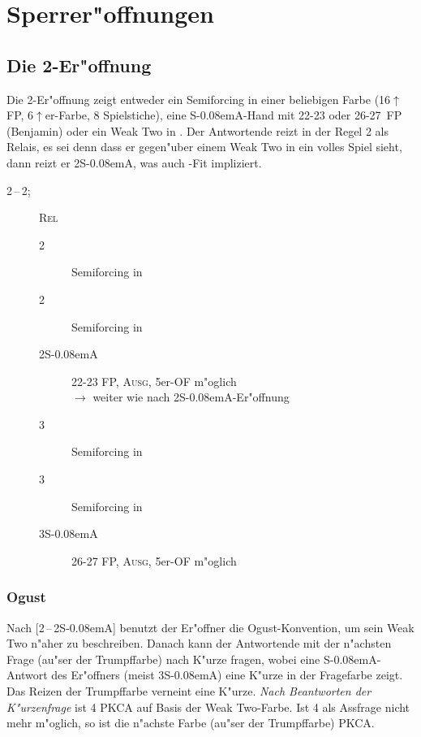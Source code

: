 \documentclass[11pt,german,twocolumn]{scrartcl}
\def\pik{\nobreak\hspace{\cardskip}\Sp\xspace}
\def\coe{\nobreak\hspace{\cardskip}\He\xspace}
\def\kar{\nobreak\hspace{\cardskip}\Di\xspace}
\def\tre{\nobreak\hspace{\cardskip}\Cl\xspace}
\def\ka{\Di\xspace}
\def\ra{$\rightarrow$\xspace}
\def\pl{$\uparrow$\xspace}
\def\ofa{\nobreak\textsf{OF}\xspace}
\def\sa{\nobreak\textsf{S\kern-0.08emA}\xspace}
\def\SA{\nobreak\hspace{\cardskip}\sa}
\def\sep{\,--\,}
\def\bal{\textsc{Ausg}\xspace}
\def\rel{\textsc{Rel}\xspace}
\def\bdsc{\begin{description}}
\def\edsc{\end{description}}
\newcommand{\Index}[1]{#1\index{#1}}
\begin{document}
\newpage
\section{Sperrer"offnungen}

\subsection{Die 2\tre-Er"offnung}

Die 2\tre-Er"offnung zeigt entweder ein Semiforcing in einer beliebigen Farbe
(16\pl FP, 6\pl{}er-Farbe, 8 Spielstiche),
eine \sa-Hand mit 22-23 oder 26-27~FP (Benjamin) oder ein \Index{Weak Two} in \ka. Der
Antwortende reizt in der Regel 2\kar als Relais, es sei denn dass er gegen"uber
einem Weak Two in \ka ein volles Spiel sieht, dann reizt er 2\SA, was auch
\ka-Fit impliziert.

\bdsc
\item[2\tre{}\sep2\kar;] \rel
  \bdsc
  \item[2\coe] Semiforcing in \coe
  \item[2\pik] Semiforcing in \pik
  \item[2\SA] 22-23 FP, \bal, 5er-\ofa m"oglich \\
    \ra weiter wie nach 2\SA-Er"offnung
  \item[3\tre] Semiforcing in \tre
  \item[3\kar] Semiforcing in \kar
  \item[3\SA] 26-27 FP, \bal, 5er-\ofa m"oglich
  \edsc
\edsc

\subsubsection{Ogust} \label{ogust}

Nach [2\tre{}\sep2\SA] benutzt der Er"offner die Ogust-Konvention, um sein Weak
Two n"aher zu beschreiben. Danach kann der Antwortende mit der n"achsten Frage
(au"ser der Trumpffarbe) nach K"urze fragen, wobei eine \sa-Antwort des
Er"offners (meist 3\SA) eine K"urze in der Fragefarbe zeigt. Das Reizen der
Trumpffarbe verneint eine K"urze. \emph{Nach Beantworten der K"urzenfrage} ist
4\tre PKCA auf Basis der Weak Two-Farbe. Ist 4\tre als Assfrage nicht mehr
m"oglich, so ist die n"achste Farbe (au"ser der Trumpffarbe) PKCA.
\end{document}
